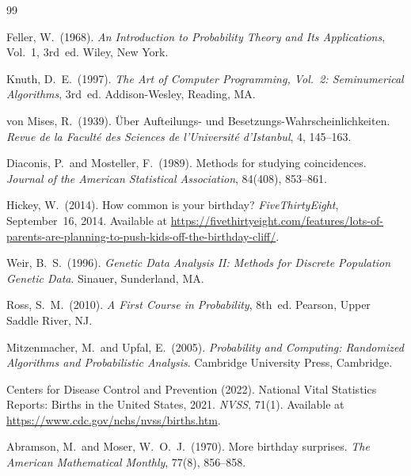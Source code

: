 \documentclass[12pt]{report}
\theoremstyle{definition}
\begin{document}

\begin{thebibliography}{99}

Feller, W.\ (1968).
\newblock \textit{An Introduction to Probability Theory and Its Applications},
  Vol.~1, 3rd~ed.
\newblock Wiley, New York.

Knuth, D.~E.\ (1997).
\newblock \textit{The Art of Computer Programming, Vol.~2: Seminumerical
  Algorithms}, 3rd~ed.
\newblock Addison-Wesley, Reading, MA.

von Mises, R.\ (1939).
\newblock \"{U}ber Aufteilungs- und Besetzungs-Wahrscheinlichkeiten.
\newblock \textit{Revue de la Facult\'{e} des Sciences de l'Universit\'{e}
  d'Istanbul}, 4, 145--163.

Diaconis, P.\ and Mosteller, F.\ (1989).
\newblock Methods for studying coincidences.
\newblock \textit{Journal of the American Statistical Association}, 84(408),
  853--861.

Hickey, W.\ (2014).
\newblock How common is your birthday?
\newblock \textit{FiveThirtyEight}, September~16, 2014.
\newblock Available at \url{https://fivethirtyeight.com/features/lots-of-parents-are-planning-to-push-kids-off-the-birthday-cliff/}.

Weir, B.~S.\ (1996).
\newblock \textit{Genetic Data Analysis II: Methods for Discrete Population
  Genetic Data}.
\newblock Sinauer, Sunderland, MA.

Ross, S.~M.\ (2010).
\newblock \textit{A First Course in Probability}, 8th~ed.
\newblock Pearson, Upper Saddle River, NJ.

Mitzenmacher, M.\ and Upfal, E.\ (2005).
\newblock \textit{Probability and Computing: Randomized Algorithms and
  Probabilistic Analysis}.
\newblock Cambridge University Press, Cambridge.

Centers for Disease Control and Prevention (2022).
\newblock National Vital Statistics Reports: Births in the United States, 2021.
\newblock \textit{NVSS}, 71(1).
\newblock Available at \url{https://www.cdc.gov/nchs/nvss/births.htm}.

Abramson, M.\ and Moser, W.~O.~J.\ (1970).
\newblock More birthday surprises.
\newblock \textit{The American Mathematical Monthly}, 77(8), 856--858.

\end{thebibliography}
\end{document}
